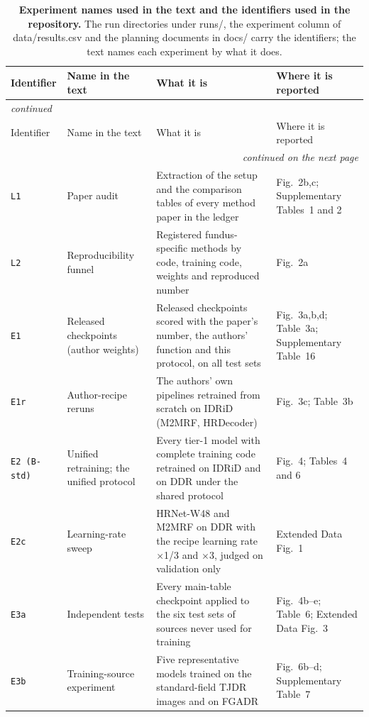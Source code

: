 
{\scriptsize\setlength{\tabcolsep}{3.2pt}\setlength{\LTcapwidth}{\textwidth}\renewcommand{\arraystretch}{1.08}
\begin{longtable}{l p{40mm} p{66mm} p{38mm}}
\caption{\textbf{Experiment names used in the text and the identifiers used in the repository.} The run directories under runs/, the experiment column of data/results.csv and the planning documents in docs/ carry the identifiers; the text names each experiment by what it does.}\label{stab:identifiers}\\
\toprule
Identifier & Name in the text & What it is & Where it is reported \\
\midrule
\endfirsthead
\multicolumn{4}{l}{\textit{continued}}\\
\toprule
Identifier & Name in the text & What it is & Where it is reported \\
\midrule
\endhead
\midrule
\multicolumn{4}{r}{\textit{continued on the next page}}\\
\endfoot
\bottomrule
\endlastfoot
\texttt{L1} & Paper audit & Extraction of the setup and the comparison tables of every method paper in the ledger & Fig.~2b,c; Supplementary Tables~1 and 2 \\
\texttt{L2} & Reproducibility funnel & Registered fundus-specific methods by code, training code, weights and reproduced number & Fig.~2a \\
\texttt{E1} & Released checkpoints (author weights) & Released checkpoints scored with the paper's number, the authors' function and this protocol, on all test sets & Fig.~3a,b,d; Table~3a; Supplementary Table~16 \\
\texttt{E1r} & Author-recipe reruns & The authors' own pipelines retrained from scratch on IDRiD (M2MRF, HRDecoder) & Fig.~3c; Table~3b \\
\texttt{E2 (B-std)} & Unified retraining; the unified protocol & Every tier-1 model with complete training code retrained on IDRiD and on DDR under the shared protocol & Fig.~4; Tables~4 and 6 \\
\texttt{E2c} & Learning-rate sweep & HRNet-W48 and M2MRF on DDR with the recipe learning rate $\times$1/3 and $\times$3, judged on validation only & Extended Data Fig.~1 \\
\texttt{E3a} & Independent tests & Every main-table checkpoint applied to the six test sets of sources never used for training & Fig.~4b--e; Table~6; Extended Data Fig.~3 \\
\texttt{E3b} & Training-source experiment & Five representative models trained on the standard-field TJDR images and on FGADR & Fig.~6b--d; Supplementary Table~7 \\

\end{longtable}}
